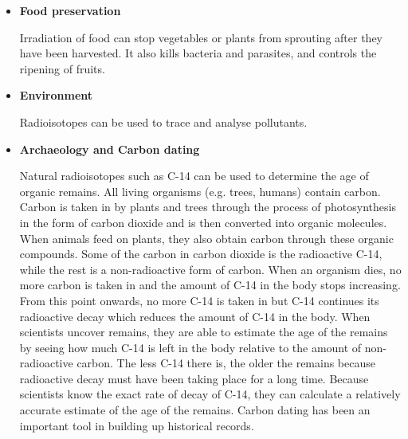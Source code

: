 \begin{itemize}
\item{\textbf{Food preservation}}

Irradiation of food can stop vegetables or plants from sprouting after they have been harvested. It also kills bacteria and parasites, and controls the ripening of fruits.

\item{\textbf{Environment}}

Radioisotopes can be used to trace and analyse pollutants.

\item{\textbf{Archaeology and Carbon dating}}

Natural radioisotopes such as C-14 can be used to determine the age of organic remains. All living organisms (e.g. trees, humans) contain carbon. Carbon is taken in by plants and trees through the process of photosynthesis in the form of carbon dioxide and is then converted into organic molecules. When animals feed on plants, they also obtain carbon through these organic compounds. Some of the carbon in carbon dioxide is the radioactive C-14, while the rest is a non-radioactive form of carbon. When an organism dies, no more carbon is taken in and the amount of C-14 in the body stops increasing. From this point onwards, no more C-14 is taken in but C-14 continues its radioactive decay which reduces the amount of C-14 in the body. When scientists uncover remains, they are able to estimate the age of the remains by seeing how much C-14 is left in the body relative to the amount of non-radioactive carbon. The less C-14 there is, the older the remains because radioactive decay must have been taking place for a long time. Because scientists know the exact rate of decay of C-14, they can calculate a relatively accurate estimate of the age of the remains. Carbon dating has been an important tool in building up historical records.

\end{itemize}
